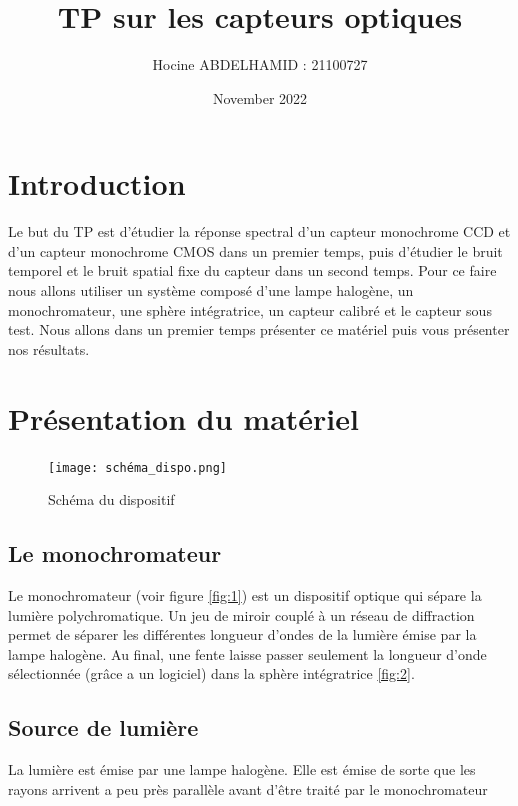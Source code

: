 \documentclass{article}
\title{TP sur les capteurs optiques}
\author{Hocine ABDELHAMID : 21100727}
\date{November 2022}
\begin{document}
\maketitle

\section{Introduction}
Le but du TP est d'étudier la réponse spectral d'un capteur monochrome CCD et d'un capteur monochrome CMOS dans un premier temps, puis d'étudier le bruit temporel et le bruit spatial fixe du capteur dans un second temps. Pour ce faire nous allons utiliser un système composé d'une lampe halogène, un monochromateur, une sphère intégratrice, un capteur calibré et le capteur sous test. Nous allons dans un premier temps présenter ce matériel puis vous présenter nos résultats.

\section{Présentation du matériel}

\begin{figure}[H]
\centering
\texttt{[image: schéma\_dispo.png]}
\label{fig:4}
\caption{Schéma du dispositif}
\end{figure}

\subsection{Le monochromateur}
Le monochromateur (voir figure \ref{fig:1}) est un dispositif optique qui sépare la lumière polychromatique. Un jeu de miroir couplé à un réseau de diffraction permet de séparer les différentes longueur d'ondes de la lumière émise par la lampe halogène. Au final, une fente laisse passer seulement la longueur d'onde sélectionnée (grâce a un logiciel) dans la sphère intégratrice \ref{fig:2}.



\subsection{Source de lumière}
La lumière est émise par une lampe halogène. Elle est émise de sorte que les rayons arrivent a peu près parallèle avant d'être traité par le monochromateur
\end{document}
